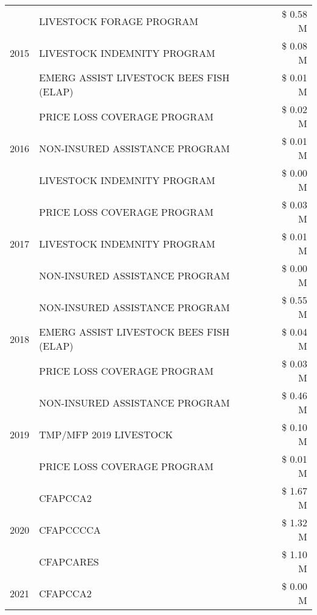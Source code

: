 \begin{tabular}{llr}
\cline{1-3}
\multirow[t]{3}{*}{2015} & LIVESTOCK FORAGE PROGRAM & \$ 0.58 M \\
 & LIVESTOCK INDEMNITY PROGRAM & \$ 0.08 M \\
 & EMERG ASSIST LIVESTOCK BEES FISH (ELAP) & \$ 0.01 M \\
\cline{1-3}
\multirow[t]{3}{*}{2016} & PRICE LOSS COVERAGE PROGRAM                   & \$ 0.02 M \\
 & NON-INSURED ASSISTANCE PROGRAM                & \$ 0.01 M \\
 & LIVESTOCK INDEMNITY PROGRAM                   & \$ 0.00 M \\
\cline{1-3}
\multirow[t]{3}{*}{2017} & PRICE LOSS COVERAGE PROGRAM & \$ 0.03 M \\
 & LIVESTOCK INDEMNITY PROGRAM & \$ 0.01 M \\
 & NON-INSURED ASSISTANCE PROGRAM & \$ 0.00 M \\
\cline{1-3}
\multirow[t]{3}{*}{2018} & NON-INSURED ASSISTANCE PROGRAM & \$ 0.55 M \\
 & EMERG ASSIST LIVESTOCK BEES FISH (ELAP) & \$ 0.04 M \\
 & PRICE LOSS COVERAGE PROGRAM & \$ 0.03 M \\
\cline{1-3}
\multirow[t]{3}{*}{2019} & NON-INSURED ASSISTANCE PROGRAM & \$ 0.46 M \\
 & TMP/MFP 2019 LIVESTOCK & \$ 0.10 M \\
 & PRICE LOSS COVERAGE PROGRAM & \$ 0.01 M \\
\cline{1-3}
\multirow[t]{3}{*}{2020} & CFAPCCA2 & \$ 1.67 M \\
 & CFAPCCCCA & \$ 1.32 M \\
 & CFAPCARES & \$ 1.10 M \\
\cline{1-3}
2021 & CFAPCCA2 & \$ 0.00 M \\
\cline{1-3}
\bottomrule
\end{tabular}
